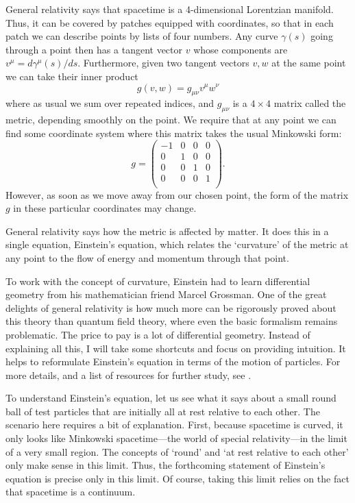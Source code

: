 \documentclass[12pt]{article}
\begin{document}
General relativity says that spacetime is a 4-dimensional Lorentzian manifold. Thus, it can be covered by patches equipped with coordinates, so that in each patch we can describe points by lists of four numbers.  Any curve $\gamma(s)$ going through a point then has a tangent vector $v$ whose components are $v^\mu = d \gamma^\mu(s)/ds$.    Furthermore, given two tangent vectors $v,w$ at the same point we 
can take their inner product
\[       g(v,w) = g_{\mu \nu} v^\mu w^\nu  \]
where as usual we sum over repeated indices, and $g_{\mu \nu}$ is a $4 \times 4$ matrix called the metric, depending smoothly on the point.    We require that at any point we can find some coordinate system where this matrix takes the usual Minkowski form:
\[   g =  \left( \begin{array}{cccc} 
                 -1 & 0 &0 & 0  \\ 
                 0     & 1 &0 & 0  \\
                 0     & 0 &1 & 0  \\
                 0     & 0 &0 & 1  \\
\end{array}\right).
\]
However, as soon as we move away from our chosen point, the form of the matrix $g$ in these particular coordinates may change.   

General relativity says how the metric is affected by matter.   It does this in a single equation, Einstein's equation, which relates the `curvature' of the metric at any point to the flow of energy and momentum through that point.   

To work with the concept of curvature, Einstein had to learn differential geometry from his mathematician friend Marcel Grossman.    One of the great delights of general relativity is how much more can be rigorously proved about this theory than quantum field theory, where even the basic formalism remains problematic.  The price to pay is a lot of differential geometry.   Instead of explaining all this, I will take some shortcuts and focus on providing intuition.    It helps to reformulate Einstein's equation in terms of the motion of particles.  For more details, and a list of resources for further study, see \cite{BaezBunn}.

To understand Einstein's equation, let us see what it says about a small round ball of test particles that are initially all at rest relative to each other.   The scenario here requires a bit of explanation.   First, because spacetime is curved, it only looks like Minkowski spacetime---the world of special relativity---in the limit of a very small region.   The concepts of `round' and `at rest relative to each other' only make sense in this limit.  Thus, the forthcoming statement of Einstein's equation is precise only in this limit.  Of course, taking this limit relies on the fact that spacetime is a continuum.
\end{document}
